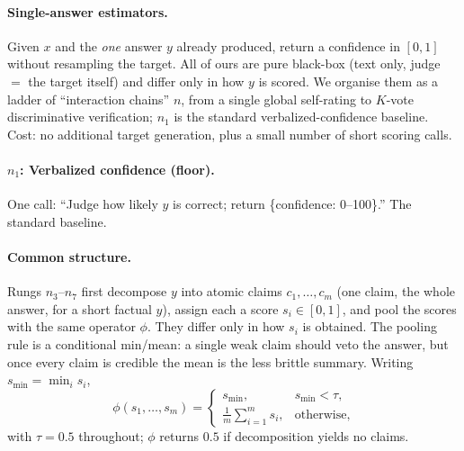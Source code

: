 \documentclass[11pt]{article}
\begin{document}
\paragraph{Single-answer estimators.} Given $x$ and the \emph{one} answer $y$ already produced,
return a confidence in $[0,1]$ without resampling the target. All of ours are pure black-box
(text only, judge $=$ the target itself) and differ only in how $y$ is scored. We organise them
as a ladder of ``interaction chains'' $n$, from a single global self-rating to $K$-vote
discriminative verification; $n_1$ is the standard verbalized-confidence baseline. Cost: no
additional target generation, plus a small number of short scoring calls.

\paragraph{$n_1$: Verbalized confidence (floor).} One call: ``Judge how likely $y$ is
correct; return \{confidence: 0--100\}.'' The standard baseline.

\paragraph{Common structure.} Rungs $n_3$--$n_7$ first decompose $y$ into atomic claims
$c_1,\dots,c_m$ (one claim, the whole answer, for a short factual $y$), assign each a score
$s_i\in[0,1]$, and pool the scores with the same operator $\phi$. They differ only in how
$s_i$ is obtained. The pooling rule is a conditional min/mean: a single weak claim should veto
the answer, but once every claim is credible the mean is the less brittle summary. Writing
$s_{\min}=\min_i s_i$,
\begin{equation}
\phi(s_1,\dots,s_m)=
\begin{cases}
s_{\min}, & s_{\min} < \tau,\\[2pt]
\frac{1}{m}\sum_{i=1}^{m} s_i, & \text{otherwise,}
\end{cases}
\label{eq:phi}
\end{equation}
with $\tau=0.5$ throughout; $\phi$ returns $0.5$ if decomposition yields no claims.
\end{document}
